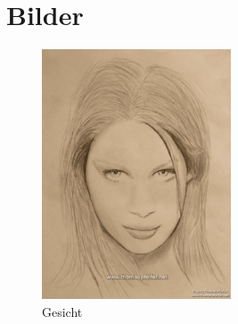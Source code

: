 \section{Bilder}
\label{sec:Bilder}

\lipsum[1]
\begin{figure}[h]
	\centering
		\includegraphics[width=0.50\textwidth]{bilder.jpg}
	\caption{Gesicht}
	\label{fig:bilder}
\end{figure}
\lipsum[1-2]
